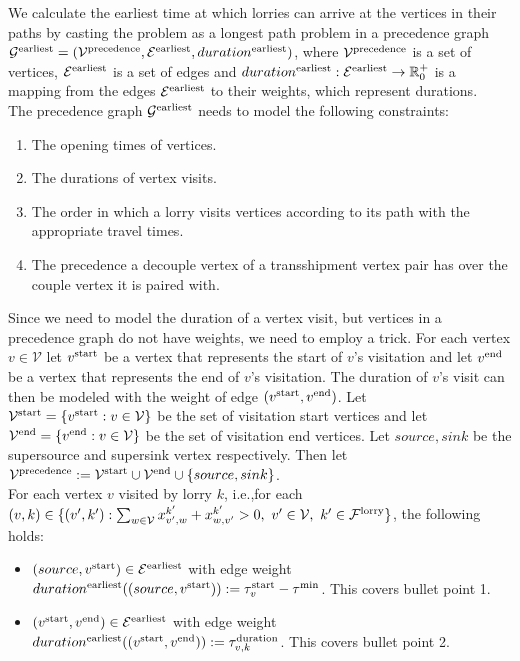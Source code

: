 We calculate the earliest time at which lorries can arrive at the vertices in their paths by casting the problem as a longest path problem in a precedence graph
$\mathcal G^{\rm earliest} = (\mathcal V^{\rm precedence},\mathcal E^{\rm earliest} , duration^{\rm earliest})$, where
$\mathcal V^{\rm precedence}$
is a set of vertices,
$\mathcal E^{\rm earliest}$
is a set of edges and
$duration^{\rm earliest}:\mathcal E^{\rm earliest} \rightarrow \mathbb R^+_0$
is a mapping from
the edges  $\mathcal E^{\rm earliest}$ to their weights, which represent durations. \\


The precedence graph
$\mathcal G^{\rm earliest} $
needs to model the following constraints:
\begin{enumerate}
  \item The opening times of vertices.
  \item The durations of vertex visits.
  \item The order in which a lorry visits vertices according to its path with the appropriate travel times.
  \item The precedence a decouple vertex of a transshipment vertex pair has over the couple vertex it is paired with.
\end{enumerate}


Since we need to model the duration of a vertex visit, but vertices in a precedence graph do not have weights, we need to employ a trick.
For each vertex $v \in \mathcal V$ let
$v^{\rm start}$
be a vertex that represents the start of $v$'s  visitation
and let
$v^{\rm end}$
be a vertex that represents the end of $v$'s  visitation.
The duration of $v$'s visit can then be modeled with the weight of edge
$(v^{\rm start},v^{\rm end})$.
Let
$\mathcal V^{\rm start} = \{  v^{\rm start} : v \in \mathcal V \} $
be the set of visitation start vertices
and let
$\mathcal V^{\rm end} = \{  v^{\rm end} : v \in \mathcal V \} $
be the set of visitation end vertices.
Let
$source,sink $
be the supersource and supersink vertex respectively.
Then let
$\mathcal V^{\rm precedence} :=
\mathcal V^{\rm start}
\cup
\mathcal V^{\rm end}
\cup
\{source,sink\}$.\\


For each vertex $v$ visited by lorry $k$, i.e.,for each
 $(v,k) \in  \{ (v',k') :
\sum_{w \in \mathcal V} x^{k'}_{v',w} + x^{k'}_{w,v'} > 0,
\ v' \in \mathcal V,
\ k' \in \mathcal F^{\rm lorry} \}$,
the following holds:
\begin{itemize}
  \item
  $(source,v^{\rm start})  \in \mathcal E^{\rm earliest} $
  with edge weight
    $duration^{\rm earliest}((source,v^{\rm start})) := \tau^{\rm start}_v - \tau^{\rm min} $.
    This covers bullet point 1.
  \item
  $(v^{\rm start},v^{\rm end}) \in \mathcal E^{\rm earliest}$
  with edge weight
  $duration^{\rm earliest}((v^{\rm start},v^{\rm end})) := \tau^{\rm duration}_{v,k}$.
  This covers bullet point 2.
\end{itemize}

